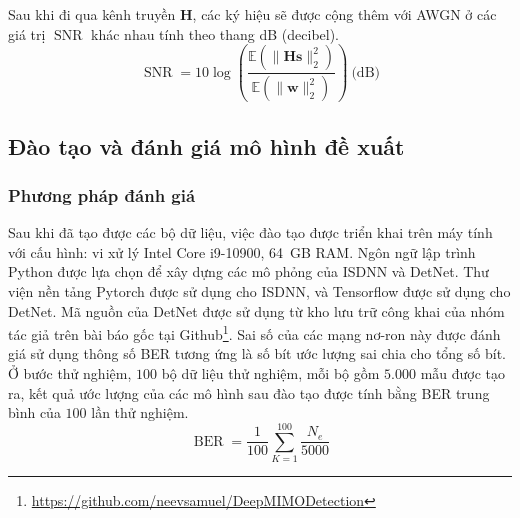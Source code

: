 Sau khi đi qua kênh truyền $\mathbf{H}$, các ký hiệu sẽ được cộng thêm với AWGN ở các giá trị $\operatorname{SNR}$ khác nhau tính theo thang dB (decibel). 
\begin{equation}
\operatorname{SNR} = 10 \log \left(\frac{\mathbb{E}\left(\|\mathbf{H s}\|_2^2\right)}{\mathbb{E}\left(\|\mathbf{w}\|_2^2\right)}\right)~\text{(dB)}
\end{equation}

\subsection{Đào tạo và đánh giá mô hình đề xuất}

\subsubsection{Phương pháp đánh giá}

Sau khi đã tạo được các bộ dữ liệu, việc đào tạo được triển khai trên máy tính với cấu hình: vi xử lý Intel Core i9-10900, 64~GB RAM. Ngôn ngữ lập trình Python được lựa chọn để xây dựng các mô phỏng của ISDNN và DetNet. Thư viện nền tảng Pytorch được sử dụng cho ISDNN, và Tensorflow được sử dụng cho DetNet. Mã nguồn của DetNet được sử dụng từ kho lưu trữ công khai của nhóm tác giả trên bài báo gốc tại Github\footnote{\url{https://github.com/neevsamuel/DeepMIMODetection}}. Sai số của các mạng nơ-ron này được đánh giá sử dụng thông số BER tương ứng là số bít ước lượng sai chia cho tổng số bít. Ở bước thử nghiệm, $100$ bộ dữ liệu thử nghiệm, mỗi bộ gồm $5.000$ mẫu được tạo ra, kết quả ước lượng của các mô hình sau đào tạo được tính bằng BER trung bình của $100$ lần thử nghiệm.
\begin{equation}
    \operatorname{BER} = \frac{1}{100} \sum_{K=1}^{100} \frac{N_e}{5000}
\end{equation}

